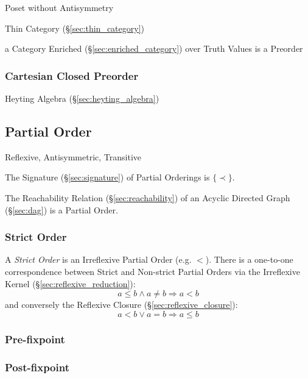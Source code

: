 Poset without Antisymmetry

Thin Category (\S\ref{sec:thin_category})

a Category Enriched (\S\ref{sec:enriched_category}) over Truth Values
is a Preorder



\subsubsection{Cartesian Closed Preorder}\label{sec:cartesian_preorder}

Heyting Algebra (\S\ref{sec:heyting_algebra})



\subsection{Partial Order}\label{sec:partial_order}

Reflexive, Antisymmetric, Transitive

The Signature (\S\ref{sec:signature}) of Partial Orderings is
$\{\prec\}$.

The Reachability Relation (\S\ref{sec:reachability}) of an Acyclic
Directed Graph (\S\ref{sec:dag}) is a Partial Order.



\subsubsection{Strict Order}\label{sec:strict_order}

A \emph{Strict Order} is an Irreflexive Partial Order (e.g. $<$).
There is a one-to-one correspondence between Strict and Non-strict
Partial Orders via the Irreflexive Kernel
(\S\ref{sec:reflexive_reduction}):
\[
  a \leq b \wedge a \neq b \Rightarrow a < b
\]
and conversely the Reflexive Closure (\S\ref{sec:reflexive_closure}):
\[
  a < b \vee a = b \Rightarrow a \leq b
\]



\subsubsection{Pre-fixpoint}\label{sec:prefixpoint}

\subsubsection{Post-fixpoint}\label{sec:postfixpoint}



